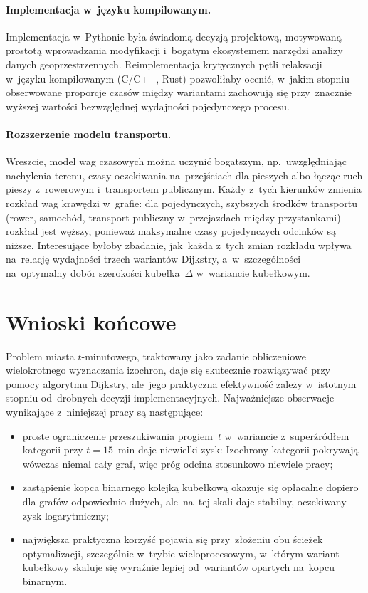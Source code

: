 \paragraph{Implementacja w~języku kompilowanym.}
Implementacja w~Pythonie była świadomą decyzją projektową, motywowaną
prostotą wprowadzania modyfikacji i~bogatym ekosystemem narzędzi
analizy danych geoprzestrzennych. Reimplementacja krytycznych pętli
relaksacji w~języku kompilowanym (C/C++, Rust)
pozwoliłaby ocenić, w~jakim stopniu obserwowane
proporcje czasów między wariantami zachowują się przy~znacznie wyższej
wartości bezwzględnej wydajności pojedynczego procesu.

\clearpage

\paragraph{Rozszerzenie modelu transportu.}
Wreszcie, model wag czasowych można uczynić bogatszym, np.\ uwzględniając
nachylenia terenu, czasy oczekiwania na~przejściach dla pieszych albo
łącząc ruch pieszy z~rowerowym i~transportem publicznym.
Każdy z~tych kierunków zmienia rozkład wag krawędzi
w~grafie: dla pojedynczych, szybszych środków transportu (rower,
samochód, transport publiczny w~przejazdach między przystankami) rozkład
jest węższy, ponieważ maksymalne czasy pojedynczych odcinków są
niższe.
Interesujące byłoby zbadanie, jak~każda z~tych zmian rozkładu wpływa
na~relację wydajności trzech wariantów Dijkstry, a~w~szczególności
na~optymalny dobór szerokości kubełka~$\Delta$ w~wariancie kubełkowym.

\section{Wnioski końcowe}
\label{sec:podsum:wnioski}

Problem miasta $t$-minutowego, traktowany jako zadanie obliczeniowe wielokrotnego
wyznaczania izochron, daje się skutecznie rozwiązywać przy pomocy
algorytmu Dijkstry, ale~jego praktyczna efektywność zależy w~istotnym
stopniu od~drobnych decyzji implementacyjnych. Najważniejsze obserwacje
wynikające z~niniejszej pracy są następujące:
\begin{itemize}
  \item proste ograniczenie przeszukiwania progiem~$t$ w~wariancie
        z~superźródłem kategorii przy $t=15$~min daje niewielki zysk:
        Izochrony kategorii pokrywają
        wówczas niemal cały graf, więc próg odcina stosunkowo niewiele pracy;
  \item zastąpienie kopca binarnego kolejką kubełkową okazuje się
        opłacalne dopiero dla grafów odpowiednio dużych, ale~na~tej
        skali daje stabilny, oczekiwany zysk logarytmiczny;
  \item największa praktyczna korzyść pojawia się przy~złożeniu obu
        ścieżek optymalizacji, szczególnie w~trybie wieloprocesowym,
        w~którym wariant kubełkowy skaluje się wyraźnie lepiej
        od~wariantów opartych na~kopcu binarnym.
\end{itemize}

